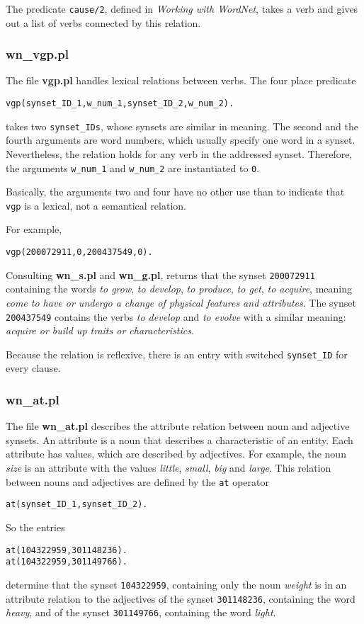 \documentclass[12pt]{article}
\begin{document}
The predicate {\tt cause/2}, defined in \emph{Working with WordNet}, takes a verb and gives out a list of verbs connected by this
relation.

\subsubsection{wn\_vgp.pl}

The file {\bfseries vgp.pl} handles lexical relations between verbs. The four place predicate
\begin{verbatim}
vgp(synset_ID_1,w_num_1,synset_ID_2,w_num_2).
\end{verbatim}
takes two {\tt synset\_IDs}, whose synsets are similar in meaning.
The second and the fourth arguments are word numbers, which usually specify one word in a synset.
Nevertheless, the relation holds for any verb in the addressed synset.
Therefore, the arguments {\tt w\_num\_1} and {\tt w\_num\_2} are instantiated to {\tt 0}.


Basically, the arguments two and four have no other use than to indicate that {\tt vgp} is a lexical, not a semantical relation.

For example,
\begin{verbatim}
vgp(200072911,0,200437549,0).
\end{verbatim}
Consulting {\bfseries wn\_s.pl} and {\bfseries wn\_g.pl}, returns that the synset {\tt 200072911}
containing the words \emph{to grow}, \emph{to develop}, \emph{to produce},
\emph{to get}, \emph{to acquire}, meaning \emph{come to have or undergo a change of physical features and attributes}.
The synset {\tt 200437549} contains the verbs \emph{to develop} and \emph{to evolve} with a similar meaning:
\emph{acquire or build up traits or characteristics}.

Because the relation is reflexive, there is an entry with switched {\tt synset\_ID} for every clause.

\subsubsection{wn\_at.pl}

The file {\bfseries wn\_at.pl} describes the attribute relation between noun and adjective synsets.
An attribute is a noun that describes
a characteristic of an entity. Each attribute has values, which are described by adjectives. For example, the noun
\emph{size} is an attribute with the values \emph{little}, \emph{small}, \emph{big} and \emph{large}.
This relation between nouns and adjectives are
defined by the {\tt at} operator
\begin{verbatim}
at(synset_ID_1,synset_ID_2).
\end{verbatim}
So the entries
\begin{verbatim}
at(104322959,301148236).
at(104322959,301149766).
\end{verbatim}
determine that the synset {\tt 104322959}, containing only the noun \emph{weight} is in an attribute relation to the adjectives
of the synset {\tt 301148236}, containing the word \emph{heavy}, and of the synset {\tt 301149766}, containing the word \emph{light}.
\end{document}
